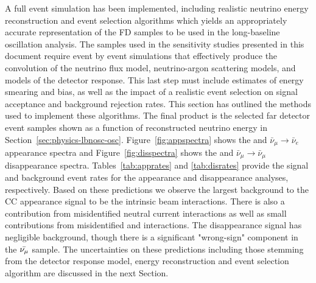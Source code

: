 A full event simulation has been implemented, including realistic neutrino energy reconstruction and event selection algorithms which yields an appropriately accurate representation of the FD samples to be used in the long-baseline oscillation analysis. The samples used in the sensitivity studies presented in this document require event by event simulations that effectively produce the convolution of the neutrino flux model, neutrino-argon scattering models, and models of the detector response. This last step must include estimates of energy smearing and bias, as well as the impact of a realistic event selection on signal acceptance and background rejection rates. This section has outlined the methods used to implement these algorithms. The final product is the  selected far detector event samples shown as a function of reconstructed neutrino energy in Section~\ref{sec:physics-lbnosc-osc}. Figure~\ref{fig:appspectra} shows the \numutonue and $\bar{\nu}_\mu \to \bar{\nu}_e$ appearance spectra and Figure~\ref{fig:disspectra} shows the \numutonumu and  $\bar{\nu}_\mu \to \bar{\nu}_\mu$ disappearance spectra. Tables~\ref{tab:apprates} and \ref{tab:disrates} provide the signal and background event rates for the appearance and disappearance analyses, respectively. Based on these predictions we observe the largest background to the \nue CC appearance signal to be the intrinsic beam \nue interactions. There is also a contribution from misidentified neutral current interactions as well as small contributions from misidentified \numu and \nutau interactions. The \numu disappearance signal has negligible background, though there is a significant "wrong-sign" \numu component in the $\bar{\nu_\mu}$ sample. The uncertainties on these predictions including those stemming from the detector response model, energy reconstruction and event selection algorithm are discussed in the next Section.

